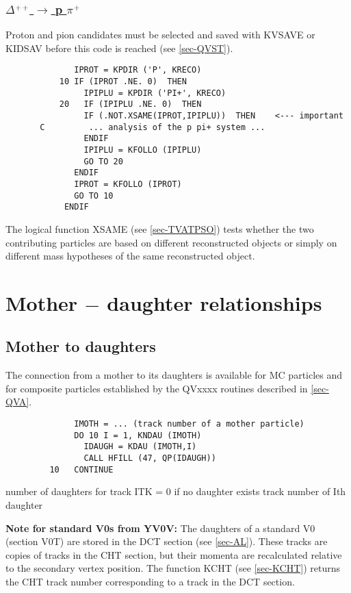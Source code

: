\subsubsection{\underline{$\Delta$$\sp{+}$$\sp{+}$
$\rightarrow$ p $\pi$$\sp{+}$}}
\par
Proton and pion candidates must be selected and saved with KVSAVE
or KIDSAV before this code is reached (see \ref{sec-QVST}).
\begin{verbatim}
              IPROT = KPDIR ('P', KRECO)
           10 IF (IPROT .NE. 0)  THEN
                IPIPLU = KPDIR ('PI+', KRECO)
           20   IF (IPIPLU .NE. 0)  THEN
                IF (.NOT.XSAME(IPROT,IPIPLU))  THEN    <--- important
       C         ... analysis of the p pi+ system ...
                ENDIF
                IPIPLU = KFOLLO (IPIPLU)
                GO TO 20
              ENDIF
              IPROT = KFOLLO (IPROT)
              GO TO 10
            ENDIF
\end{verbatim}
 
The logical function XSAME (see \ref{sec-TVATPSO}) tests whether the
two
contributing particles are based on
different reconstructed objects or simply on different mass
hypotheses of the same reconstructed object.
 
\section{\label{sec-AM}Mother $-$ daughter relationships}
\par
\subsection{\label{sec-AMM}Mother to daughters}
\par
The connection
from a mother to its daughters is available for MC particles
and for composite particles established by the QVxxxx
routines described in \ref{sec-QVA}.
\begin{verbatim}
              IMOTH = ... (track number of a mother particle)
              DO 10 I = 1, KNDAU (IMOTH)
                IDAUGH = KDAU (IMOTH,I)
                CALL HFILL (47, QP(IDAUGH))
         10   CONTINUE
\end{verbatim}
\begin{indentlist}{ 3.00cm}{ 3.25cm}
number of daughters for track ITK
= 0 if no daughter exists
track number of Ith daughter
\end{indentlist}
{\bf Note for standard V0s from YV0V:} The daughters of a standard V0
 (section V0T) are
stored in the DCT section (see \ref{sec-AL}).
These tracks are copies of tracks in the
CHT section, but their momenta are recalculated relative
to the secondary vertex position.
The function KCHT (see \ref{sec-KCHT})
returns the CHT track number corresponding to
a track in the DCT section.
\par

